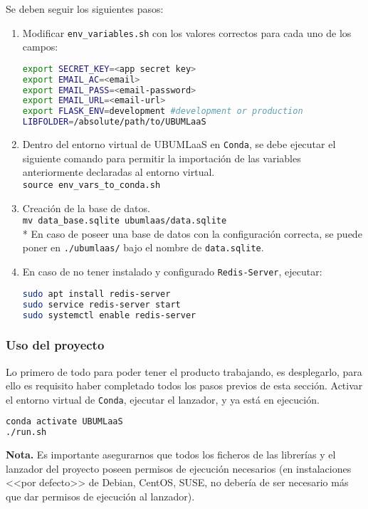 Se deben seguir los siguientes pasos:
\begin{enumerate}
\item Modificar \texttt{env\_variables.sh} con los valores correctos para cada uno de los campos:
\begin{lstlisting}[language=bash]
export SECRET_KEY=<app secret key>
export EMAIL_AC=<email>
export EMAIL_PASS=<email-password>
export EMAIL_URL=<email-url>
export FLASK_ENV=development #development or production
LIBFOLDER=/absolute/path/to/UBUMLaaS
\end{lstlisting}
\item Dentro del entorno virtual de UBUMLaaS en \texttt{Conda}, se debe ejecutar el siguiente comando para permitir la importación de las variables anteriormente declaradas al entorno virtual.\\
\texttt{source env\_vars\_to\_conda.sh}
\item Creación de la base de datos.\\
\texttt{mv data\_base.sqlite ubumlaas/data.sqlite}\\
* En caso de poseer una base de datos con la configuración correcta, se puede poner en \texttt{./ubumlaas/} bajo el nombre de \texttt{data.sqlite}.
\item En caso de no tener instalado y configurado \texttt{Redis-Server}, ejecutar:
\begin{lstlisting}[language=bash]
sudo apt install redis-server
sudo service redis-server start
sudo systemctl enable redis-server
\end{lstlisting}
\end{enumerate}

\subsubsection{Uso del proyecto}
Lo primero de todo para poder tener el producto trabajando, es desplegarlo, para ello es requisito haber completado todos los pasos previos de esta sección. Activar el entorno virtual de \texttt{Conda}, ejecutar el lanzador, y ya está en ejecución.
\begin{lstlisting}[language=bash]
conda activate UBUMLaaS
./run.sh
\end{lstlisting}
\textbf{Nota.} Es importante asegurarnos que todos los ficheros de las librerías y el lanzador del proyecto poseen permisos de ejecución necesarios (en instalaciones <<por defecto>> de Debian, CentOS, SUSE, no debería de ser necesario más que dar permisos de ejecución al lanzador).

